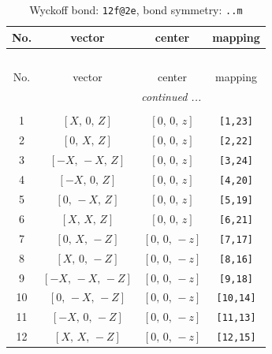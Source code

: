 \documentclass[fleqn,8pt]{jsarticle}
\begin{document}
\begin{longtable}{cccc}
\caption{Wyckoff bond: {\tt 12f@2e}, bond symmetry: {\tt ..m}}
 \\
 \hline \hline
No. & vector & center & mapping \\ \hline \endfirsthead

\multicolumn{3}{l}{\tablename\ \thetable{}} \\
 \hline \hline
No. & vector & center & mapping \\ \hline \endhead

 \hline \hline
\multicolumn{3}{r}{\footnotesize\it continued ...} \\ \endfoot

 \hline \hline
\multicolumn{3}{r}{} \\ \endlastfoot

1 & $\left[ X,\, 0,\, Z \right]$ & $\left[ 0,\, 0,\, z \right]$ & {\tt [1,23]} \\ \hline
2 & $\left[ 0,\, X,\, Z \right]$ & $\left[ 0,\, 0,\, z \right]$ & {\tt [2,22]} \\ \hline
3 & $\left[ - X,\, - X,\, Z \right]$ & $\left[ 0,\, 0,\, z \right]$ & {\tt [3,24]} \\ \hline
4 & $\left[ - X,\, 0,\, Z \right]$ & $\left[ 0,\, 0,\, z \right]$ & {\tt [4,20]} \\ \hline
5 & $\left[ 0,\, - X,\, Z \right]$ & $\left[ 0,\, 0,\, z \right]$ & {\tt [5,19]} \\ \hline
6 & $\left[ X,\, X,\, Z \right]$ & $\left[ 0,\, 0,\, z \right]$ & {\tt [6,21]} \\ \hline
7 & $\left[ 0,\, X,\, - Z \right]$ & $\left[ 0,\, 0,\, - z \right]$ & {\tt [7,17]} \\ \hline
8 & $\left[ X,\, 0,\, - Z \right]$ & $\left[ 0,\, 0,\, - z \right]$ & {\tt [8,16]} \\ \hline
9 & $\left[ - X,\, - X,\, - Z \right]$ & $\left[ 0,\, 0,\, - z \right]$ & {\tt [9,18]} \\ \hline
10 & $\left[ 0,\, - X,\, - Z \right]$ & $\left[ 0,\, 0,\, - z \right]$ & {\tt [10,14]} \\ \hline
11 & $\left[ - X,\, 0,\, - Z \right]$ & $\left[ 0,\, 0,\, - z \right]$ & {\tt [11,13]} \\ \hline
12 & $\left[ X,\, X,\, - Z \right]$ & $\left[ 0,\, 0,\, - z \right]$ & {\tt [12,15]} \\
\end{longtable}
\renewcommand{\arraystretch}{1.2}
\end{document}
